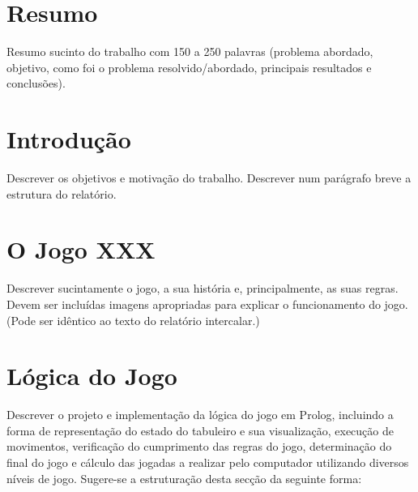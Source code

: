 \documentclass[a4paper]{article}
\begin{document}
\newpage

\section*{Resumo}
Resumo sucinto do trabalho com 150 a 250 palavras (problema abordado, objetivo, como foi o problema resolvido/abordado, principais resultados e conclusões).

\newpage

\tableofcontents



\newpage

\section{Introdução}

Descrever os objetivos e motivação do trabalho. Descrever num parágrafo breve a estrutura do relatório.


\section{O Jogo XXX}

Descrever sucintamente o jogo, a sua história e, principalmente, as suas regras. Devem ser incluídas imagens apropriadas para explicar o funcionamento do jogo. (Pode ser idêntico ao texto do relatório intercalar.)


\section{Lógica do Jogo}

Descrever o projeto e implementação da lógica do jogo em Prolog, incluindo a forma de representação do estado do tabuleiro e sua visualização, execução de movimentos, verificação do cumprimento das regras do jogo, determinação do final do jogo e cálculo das jogadas a realizar pelo computador utilizando diversos níveis de jogo. Sugere-se a estruturação desta secção da seguinte forma:
\end{document}
